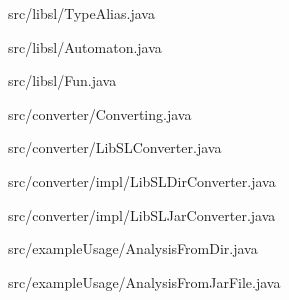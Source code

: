 



{src/libsl/TypeAlias.java}


{src/libsl/Automaton.java}


{src/libsl/Fun.java}


{src/converter/Converting.java}


{src/converter/LibSLConverter.java}


{src/converter/impl/LibSLDirConverter.java}


{src/converter/impl/LibSLJarConverter.java}


{src/exampleUsage/AnalysisFromDir.java}


{src/exampleUsage/AnalysisFromJarFile.java}
